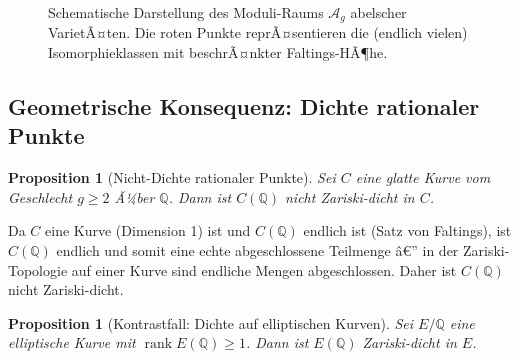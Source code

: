 ﻿\documentclass[12pt,a4paper]{article}
\theoremstyle{plain}
\newtheorem{proposition}[theorem]{Proposition}
\theoremstyle{definition}
\theoremstyle{remark}
\newenvironment{proof*}[1][Beweis]{%
  \begin{proof}[#1]\renewcommand{\qedsymbol}{$\blacksquare$}}
  {\end{proof}}
\newcommand{\Q}{\mathbb{Q}}
\DeclareMathOperator{\rank}{rank}
\begin{document}
\begin{figure}[H]
\centering
{}
\caption{Schematische Darstellung des Moduli-Raums $\mathcal{A}_g$ abelscher VarietÃ¤ten.
  Die roten Punkte reprÃ¤sentieren die (endlich vielen) Isomorphieklassen mit beschrÃ¤nkter
  Faltings-HÃ¶he.}
\label{fig:moduli}
\end{figure}

\subsection{Geometrische Konsequenz: Dichte rationaler Punkte}

\begin{proposition}[Nicht-Dichte rationaler Punkte]\label{prop:nichtdichte}
Sei $C$ eine glatte Kurve vom Geschlecht $g \geq 2$ Ã¼ber $\Q$. Dann ist
$C(\Q)$ \emph{nicht Zariski-dicht} in $C$.
\end{proposition}

\begin{proof*}
Da $C$ eine Kurve (Dimension 1) ist und $C(\Q)$ endlich ist (Satz von Faltings),
ist $C(\Q)$ endlich und somit eine echte abgeschlossene Teilmenge â€” in der Zariski-Topologie
auf einer Kurve sind endliche Mengen abgeschlossen. Daher ist $C(\Q)$ nicht Zariski-dicht.
\end{proof*}

\begin{proposition}[Kontrastfall: Dichte auf elliptischen Kurven]\label{prop:dichte_ec}
Sei $E/\Q$ eine elliptische Kurve mit $\rank E(\Q) \geq 1$. Dann ist $E(\Q)$
Zariski-dicht in $E$.
\end{proposition}
\end{document}
